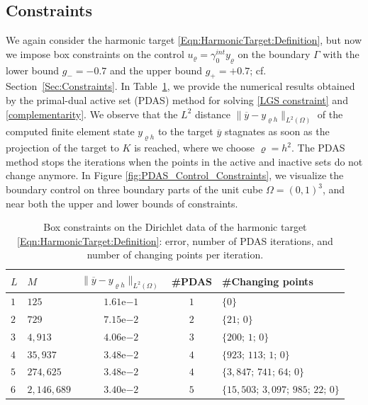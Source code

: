 \documentclass{article}
\numberwithin{equation}{section}
\begin{document}
\subsection{Constraints}
\label{Subsec:NumericalResults:Constraints}
We again consider the harmonic target \eqref{Eqn:HarmonicTarget:Definition},
but now we impose box constraints on the control
$u_\varrho = \gamma_0^{int} y_\varrho$ on the boundary $\Gamma$ 
with the lower bound $g_- = -0.7$ and the upper bound $g_+ = + 0.7$;
cf. Section~\ref{Sec:Constraints}.
In Table~\ref{tab:PDAS_Control_Constraints}, we provide the numerical results 
obtained by  the  primal-dual active set (PDAS) method 
for solving \eqref{LGS constraint} and \eqref{complementarity}.
We observe that the $L^2$
distance  $\|\overline{y} - y_{\varrho h}\|_{L^2(\Omega)}$  of the computed
finite element state $y_{\varrho h}$ to the target $\overline{y}$
stagnates as soon as the projection of the target to $K$ is reached, 
where we choose $\varrho = h^2$. The PDAS method stops the iterations
when the points in the active and inactive sets 
do not change anymore. In Figure \ref{fig:PDAS_Control_Constraints},
we visualize the  boundary control on three boundary parts
of the unit cube $\Omega = (0,1)^3$, and
near both the upper and lower bounds of constraints.

\begin{table}[ht]
  {\small
    \begin{center}
      \begin{tabular}{llccl}
      \hline
        $L$ & $M$ & $\|\overline{y} - y_{\varrho h}\|_{L^2(\Omega)}$
        &  \#PDAS & \#Changing points\\
        \hline
        $1$&$125$&$1.61$e$-1$  &$1$  & $\{0\}$\\
        $2$&$729$&$7.15$e$-2$ &$2$  & $\{21;\, 0\}$\\
        $3$&$4,913$&$4.06$e$-2$ & $3$ & $\{200;\, 1;\, 0\}$\\
        $4$&$35,937$&$3.48$e$-2$ & $4$ &$\{923;\, 113;\, 1;\, 0\}$ \\
        $5$&$274,625$&$3.48$e$-2$&$4$ &$\{3,847;\, 741;\, 64;\, 0\}$ \\
        $6$&$2,146,689$&$3.40$e$-2$ & $5$ &$\{15,503;\, 3,097;\, 985;\, 22;\, 0\}$\\
        \hline
      \end{tabular}
    \end{center}
    \caption{Box constraints on the Dirichlet data of the harmonic
      target \eqref{Eqn:HarmonicTarget:Definition}: error, number of
      PDAS iterations, and number of changing points per iteration.}
    \label{tab:PDAS_Control_Constraints}
    }
\end{table}
\end{document}
